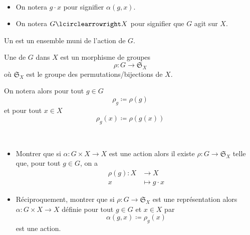 \begin{notation}\,
    \begin{itemize}
        \item On notera \(g \cdot x\) pour signifier \(\alpha(g,x)\).
        \item On notera \(G \act X\) pour signifier que \(G\) agit sur \(X\).
    \end{itemize}
\end{notation}

\begin{definition}
    Un  est un ensemble muni de l'action de \(G\).
\end{definition}


\begin{definition}
    Une  de \(G\) dans \(X\) est un
    morphisme de groupes
    \begin{equation*}
        \rho : G \to {\mathfrak{S}}_X
    \end{equation*}
    où \({\mathfrak{S}}_X\) est le groupe des permutations/bijections de \(X\).
\end{definition}

\begin{notation}
    On notera alors pour tout \(g \in G\)
    \begin{equation*}
        \rho_g\coloneq \rho(g)
    \end{equation*}
    et pour tout \(x \in X\)
    \begin{equation*}
        \rho_g(x)\coloneq \rho(g(x))
    \end{equation*}
\end{notation}

\begin{exo}\,
    \begin{itemize}
        \item Montrer que si \(\alpha : G\times X \to X\) est une action alors
        il existe \(\rho : G\to {\mathfrak{S}}_X\) telle que, 
        pour tout \(g\in G\), on a
        \begin{equation*}
            \begin{aligned}
                \rho(g) :X &\to X\\
                x &\mapsto g\cdot x
            \end{aligned}
        \end{equation*}
    
        \item Réciproquement, montrer que si \(\rho : G\to {\mathfrak{S}}_X\) est une représentation
        alors \(\alpha : G\times X \to X\) définie pour tout \(g\in G\) et \(x\in X\) par
        \begin{equation*}
            \alpha(g,x)\coloneq \rho_g(x)
        \end{equation*}
        est une action.
    \end{itemize}
\end{exo}

